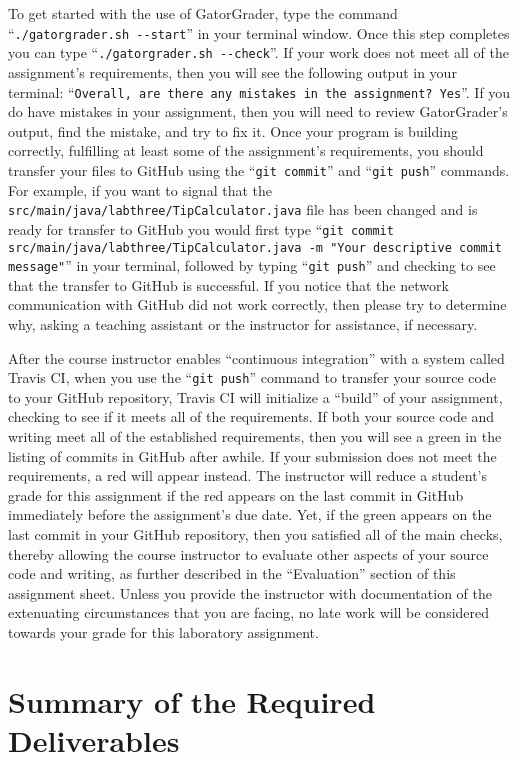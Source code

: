 \documentclass[11pt]{article}
\newcommand{\mainprogramsource}{\lstinline{src/main/java/labthree/TipCalculator.java}}
\newcommand{\gatorgraderstart}{\command{./gatorgrader.sh --start}}
\newcommand{\gatorgradercheck}{\command{./gatorgrader.sh --check}}
\newcommand{\gitcommit}{\command{git commit}}
\newcommand{\gitpush}{\command{git push}}
\newcommand{\gitcommitmainprogram}{\command{git commit src/main/java/labthree/TipCalculator.java -m "Your
descriptive commit message"}}
\newcommand{\command}[1]{``\lstinline{#1}''}
\newcommand{\step}[1]{``{#1}''}
\newcommand{\checkmark}{\ding{51}}
\newcommand{\naughtmark}{\ding{55}}
\begin{document}
To get started with the use of GatorGrader, type the command \gatorgraderstart{} in your terminal window. Once this step
completes you can type \gatorgradercheck{}. If your work does not meet all of the assignment's requirements, then you
will see the following output in your terminal: \command{Overall, are there any mistakes in the assignment? Yes}. If you
do have mistakes in your assignment, then you will need to review GatorGrader's output, find the mistake, and try to fix
it. Once your program is building correctly, fulfilling at least some of the assignment's requirements, you should
transfer your files to GitHub using the \gitcommit{} and \gitpush{} commands. For example, if you want to signal that
the \mainprogramsource{} file has been changed and is ready for transfer to GitHub you would first type
\gitcommitmainprogram{} in your terminal, followed by typing \gitpush{} and checking to see that the transfer to GitHub
is successful. If you notice that the network communication with GitHub did not work correctly, then please try to
determine why, asking a teaching assistant or the instructor for assistance, if necessary.

After the course instructor enables \step{continuous integration} with a system called Travis CI, when you use the
\gitpush{} command to transfer your source code to your GitHub repository, Travis CI will initialize a \step{build} of
your assignment, checking to see if it meets all of the requirements. If both your source code and writing meet all of
the established requirements, then you will see a green \checkmark{} in the listing of commits in GitHub after awhile.
If your submission does not meet the requirements, a red \naughtmark{} will appear instead. The instructor will reduce a
student's grade for this assignment if the red \naughtmark{} appears on the last commit in GitHub immediately before the
assignment's due date. Yet, if the green \checkmark{} appears on the last commit in your GitHub repository, then you
satisfied all of the main checks, thereby allowing the course instructor to evaluate other aspects of your source code
and writing, as further described in the \step{Evaluation} section of this assignment sheet. Unless you provide the
instructor with documentation of the extenuating circumstances that you are facing, no late work will be considered
towards your grade for this laboratory assignment.

\section*{Summary of the Required Deliverables}
\end{document}
